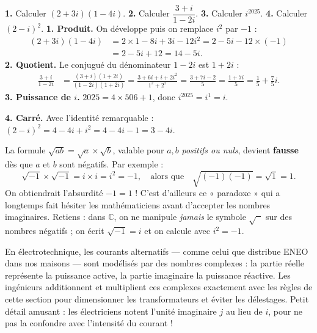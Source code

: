 \documentclass[11pt]{article}
\begin{document}
\begin{exoresolu}
\textbf{1.} Calculer $(2 + 3i)(1 - 4i)$. \quad \textbf{2.} Calculer $\dfrac{3 + i}{1 - 2i}$. \quad \textbf{3.} Calculer $i^{2025}$. \quad \textbf{4.} Calculer $(2 - i)^2$.
\tcblower
\textbf{1. Produit.} On développe puis on remplace $i^2$ par $-1$ :
\begin{align*}
(2 + 3i)(1 - 4i) &= 2\times 1 - 8i + 3i - 12i^2 = 2 - 5i - 12\times(-1) \\
&= 2 - 5i + 12 = 14 - 5i.
\end{align*}
\textbf{2. Quotient.} Le conjugué du dénominateur $1 - 2i$ est $1 + 2i$ :
\begin{align*}
\frac{3 + i}{1 - 2i} &= \frac{(3 + i)(1 + 2i)}{(1 - 2i)(1 + 2i)} = \frac{3 + 6i + i + 2i^2}{1^2 + 2^2} = \frac{3 + 7i - 2}{5} = \frac{1 + 7i}{5} = \frac{1}{5} + \frac{7}{5}i.
\end{align*}
\textbf{3. Puissance de $i$.} $2025 = 4 \times 506 + 1$, donc $i^{2025} = i^1 = i$.

\textbf{4. Carré.} Avec l'identité remarquable : $(2 - i)^2 = 4 - 4i + i^2 = 4 - 4i - 1 = 3 - 4i$.
\end{exoresolu}

\begin{attention}
La formule $\sqrt{ab} = \sqrt{a}\times\sqrt{b}$, valable pour $a, b$ \emph{positifs ou nuls}, devient \textbf{fausse} dès que $a$ et $b$ sont négatifs. Par exemple :
\[ \sqrt{-1} \times \sqrt{-1} = i \times i = i^2 = -1, \quad \text{alors que} \quad \sqrt{(-1)(-1)} = \sqrt{1} = 1. \]
On obtiendrait l'absurdité $-1 = 1$ ! C'est d'ailleurs ce « paradoxe » qui a longtemps fait hésiter les mathématiciens avant d'accepter les nombres imaginaires. Retiens : dans $\mathbb{C}$, on ne manipule \emph{jamais} le symbole $\sqrt{\phantom{x}}$ sur des nombres négatifs ; on écrit $\sqrt{-1} = i$ et on calcule avec $i^2 = -1$.
\end{attention}

\begin{savaistu}
En électrotechnique, les courants alternatifs — comme celui que distribue ENEO dans nos maisons — sont modélisés par des nombres complexes : la partie réelle représente la puissance active, la partie imaginaire la puissance réactive. Les ingénieurs additionnent et multiplient ces complexes exactement avec les règles de cette section pour dimensionner les transformateurs et éviter les délestages. Petit détail amusant : les électriciens notent l'unité imaginaire $j$ au lieu de $i$, pour ne pas la confondre avec l'intensité du courant !
\end{savaistu}
\end{document}
